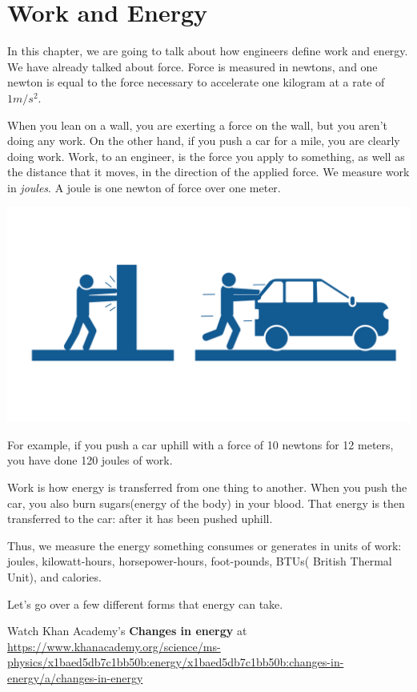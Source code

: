 \chapter{Work and Energy}

In this chapter, we are going to talk about how engineers define work
and energy.  We have already talked about force. Force is measured in
newtons, and one newton is equal to the force necessary to accelerate one
kilogram at a rate of $1 m/s^2$.

When you lean on a wall, you are exerting a force on the wall, but you
aren't doing any work. On the other hand, if you push a car for a mile,
you are clearly doing work. Work, to an engineer, is the force you
apply to something, as well as the distance that it moves, in the direction
of the applied force. We measure work in \textit{joules}. A joule is one
newton of force over one meter.

\includegraphics[width=1\textwidth]{workvsforce.png}

For example, if you push a car uphill with a force of 10 newtons for 12
meters, you have done 120 joules of work.

Work is how energy is transferred from one thing to another. When you
push the car, you also burn sugars(energy of the body) in your blood. That energy is then
transferred to the car: after it has been pushed uphill.

Thus, we measure the energy something consumes or generates in 
units of work: joules, kilowatt-hours, horsepower-hours, foot-pounds,
BTUs( British Thermal Unit), and calories.

Let's go over a few different forms that energy can take.

Watch Khan Academy's \textbf{Changes in energy} at \url{https://www.khanacademy.org/science/ms-physics/x1baed5db7c1bb50b:energy/x1baed5db7c1bb50b:changes-in-energy/a/changes-in-energy}


